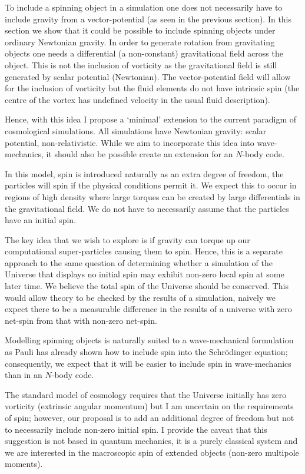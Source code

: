 To include a spinning object in a simulation one does not necessarily have to include gravity from a vector-potential (as seen in the previous section). In this section we show that it could be possible to include spinning objects under ordinary Newtonian gravity. In order to generate rotation from gravitating objects one needs a differential (a non-constant) gravitational field across the object. This is not the inclusion of vorticity as the gravitational field is still generated by scalar potential (Newtonian). The vector-potential field will allow for the inclusion of vorticity but the fluid elements do not have intrinsic spin (the centre of the vortex has undefined velocity in the usual fluid description).

Hence, with this idea I propose a `minimal' extension to the current paradigm of cosmological simulations. All simulations have Newtonian gravity: scalar potential, non-relativistic. While we aim to incorporate this idea into wave-mechanics, it should also be possible create an extension for an $N$-body code.

In this model, spin is introduced naturally as an extra degree of freedom, the particles will spin if the physical conditions permit it. We expect this to occur in regions of high density where large torques can be created by large differentials in the gravitational field. We do not have to necessarily assume that the particles have an initial spin.

The key idea that we wish to explore is if gravity can torque up our computational super-particles causing them to spin. Hence, this is a separate approach to the same question of determining whether a simulation of the Universe that displays no initial spin may exhibit non-zero local spin at some later time. We believe the total spin of the Universe should be conserved. This would allow theory to be checked by the results of a simulation, naively we expect there to be a measurable difference in the results of a universe with zero net-spin from that with non-zero net-spin.

Modelling spinning objects is naturally suited to a wave-mechanical formulation as Pauli has already shown how to include spin into the Schr\"odinger equation; consequently, we expect that it will be easier to include spin in wave-mechanics than in an $N$-body code.

The standard model of cosmology requires that the Universe initially has zero vorticity (extrinsic angular momentum) but I am uncertain on the requirements of spin; however, our proposal is to add an additional degree of freedom but not to necessarily include non-zero initial spin. I provide the caveat that this suggestion is not based in quantum mechanics, it is a purely classical system and we are interested in the macroscopic spin of extended objects (non-zero multipole moments).

